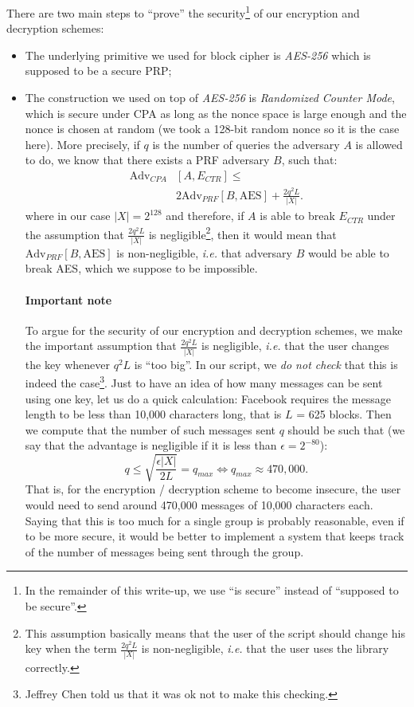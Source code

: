 \documentclass[10pt,twocolumn]{article}
\begin{document}
There are two main steps to ``prove'' the security\footnote{In the remainder of this write-up, we use ``is secure''
instead of ``supposed to be secure''.}  of our encryption and decryption schemes:
\begin{itemize}
  \item The underlying primitive we used for block cipher is \emph{AES-256} which is supposed to be a secure PRP;
  \item The construction we used on top of \emph{AES-256} is \emph{Randomized Counter Mode}, which is secure under CPA as long as the nonce space is large enough and the nonce is chosen at random (we took a 128-bit random nonce so it is the case here). More precisely, if $q$ is the number of queries the adversary $A$ is allowed to do, we know that there exists a PRF adversary $B$, such that:
\begin{equation}\label{eq:sec1}
  \begin{split}
    \text{Adv}_{CPA}&[A,E_{CTR}] \leq \\
    & 2 \text{Adv}_{PRF}[B,\text{AES}] +  \frac{2q^2L}{|X|}.
  \end{split}
\end{equation}
where in our case $|X| = 2^{128}$ and therefore, if $A$ is able to break $E_{CTR}$ under the assumption that $\frac{2q^2L}{|X|}$ is negligible\footnote{This assumption basically means that the user of the script should change his key when the term $\frac{2q^2L}{|X|}$ is non-negligible, \emph{i.e.} that the user uses the library correctly.}, then it would mean that $\text{Adv}_{PRF}[B,\text{AES}]$ is non-negligible, \emph{i.e.} that adversary $B$ would be able to break AES, which we suppose to be impossible.

\paragraph{Important note}
To argue for the security of our encryption and decryption schemes, we make the important assumption that $\frac{2q^2L}{|X|}$ is negligible, \emph{i.e.} that the user changes the key whenever $q^2L$ is ``too big''. In our script, we \emph{do not check} that this is indeed the case\footnote{Jeffrey Chen told us that it was ok not to make this checking.}. Just to have an idea of how many messages can be sent using one key, let us do a quick calculation: Facebook requires the message length to be less than 10,000 characters long, that is $L$ = 625 blocks. Then we compute that the number of such messages sent $q$ should be such that (we say that the advantage is negligible if it is less than $\epsilon = 2^{-80}$):
\begin{equation*}
q \leq \sqrt{\frac{\epsilon|X|}{2L}}  = q_{max} \Leftrightarrow q_{max} \approx 470,000.
\end{equation*}
That is, for the encryption / decryption scheme to become insecure, the user would need to send around 470,000 messages of 10,000 characters each. Saying that this is too much for a single group is probably reasonable, even if to be more secure, it would be better to implement a system that keeps track of the number of messages being sent through the group.
\end{itemize}
\end{document}
